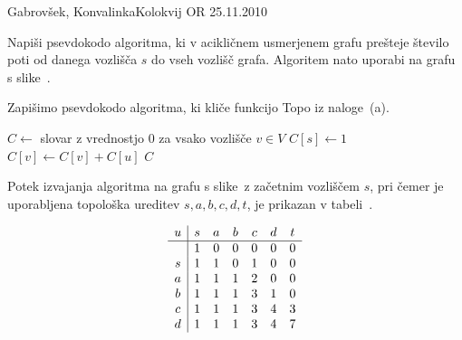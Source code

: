 \begin{naloga}{Gabrovšek, Konvalinka}{Kolokvij OR 25.11.2010}
\begin{vprasanje}
Napiši psevdokodo algoritma,
ki v acikličnem usmerjenem grafu prešteje število poti
od danega vozlišča $s$ do vseh vozlišč grafa.
Algoritem nato uporabi na grafu s slike~\fig.

\begin{slika}
\pgfslika
{}
\end{slika}
\end{vprasanje}

\begin{odgovor}
Zapišimo psevdokodo algoritma,
ki kliče funkcijo {\sc Topo} iz naloge~\res[topo]{}(a).
\begin{small}
\begin{algorithmic}
    \State $C \gets$ slovar z vrednostjo $0$ za vsako vozlišče $v \in V$
    \State $C[s] \gets 1$
            \State $C[v] \gets C[v] + C[u]$
        \EndFor
    \EndFor
    \State \Return $C$
\EndFunction
\end{algorithmic}
\end{small}
Potek izvajanja algoritma na grafu s slike~\fig z začetnim vozliščem $s$,
pri čemer je uporabljena topološka ureditev $s, a, b, c, d, t$,
je prikazan v tabeli~\tab.
%
\begin{tabela}
$$
\begin{array}{c|cccccc}
u & s & a & b & c & d & t \\ \hline
  & 1 & 0 & 0 & 0 & 0 & 0 \\
s & 1 & 1 & 0 & 1 & 0 & 0 \\
a & 1 & 1 & 1 & 2 & 0 & 0 \\
b & 1 & 1 & 1 & 3 & 1 & 0 \\
c & 1 & 1 & 1 & 3 & 4 & 3 \\
d & 1 & 1 & 1 & 3 & 4 & 7
\end{array}
$$
\end{tabela}
\end{odgovor}
\end{naloga}
